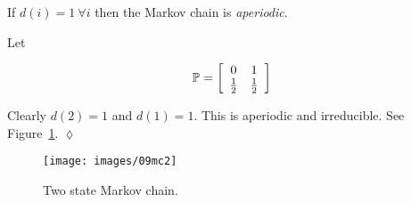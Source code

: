 \begin{definition}
If $d(i)=1~\forall i$ then the Markov chain is \textit{aperiodic}.
\end{definition}

\begin{example}
Let

\begin{equation*}
\mathbb{P} = \left[\begin{array}{c c} 0 & 1 \\ \frac{1}{2} & \frac{1}{2} \end{array}\right]
\end{equation*}

Clearly $d (2)=1$ and $d (1)=1$.
This is aperiodic and irreducible.
See Figure~\ref{fig:09mc2}.
$\lozenge$
\end{example}

\begin{figure}[ht!]
\centering
\texttt{[image: images/09mc2]}
\caption{Two state Markov chain.}%
\label{fig:09mc2}
\end{figure}

